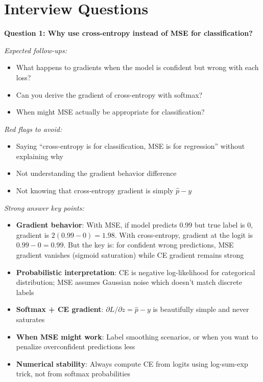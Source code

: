 \documentclass[../../main.tex]{subfiles}
\begin{document}
\section*{Interview Questions}
\begin{interviewquestions}

\textbf{Question 1: Why use cross-entropy instead of MSE for classification?}

\textit{Expected follow-ups:}
\begin{itemize}
    \item What happens to gradients when the model is confident but wrong with each loss?
    \item Can you derive the gradient of cross-entropy with softmax?
    \item When might MSE actually be appropriate for classification?
\end{itemize}

\textit{Red flags to avoid:}
\begin{itemize}
    \item Saying ``cross-entropy is for classification, MSE is for regression'' without explaining why
    \item Not understanding the gradient behavior difference
    \item Not knowing that cross-entropy gradient is simply $\hat{p} - y$
\end{itemize}

\textit{Strong answer key points:}
\begin{itemize}
    \item \textbf{Gradient behavior}: With MSE, if model predicts 0.99 but true label is 0, gradient is $2(0.99-0) = 1.98$. With cross-entropy, gradient at the logit is $0.99 - 0 = 0.99$. But the key is: for confident wrong predictions, MSE gradient vanishes (sigmoid saturation) while CE gradient remains strong
    \item \textbf{Probabilistic interpretation}: CE is negative log-likelihood for categorical distribution; MSE assumes Gaussian noise which doesn't match discrete labels
    \item \textbf{Softmax + CE gradient}: $\partial L / \partial z = \hat{p} - y$ is beautifully simple and never saturates
    \item \textbf{When MSE might work}: Label smoothing scenarios, or when you want to penalize overconfident predictions less
    \item \textbf{Numerical stability}: Always compute CE from logits using log-sum-exp trick, not from softmax probabilities
\end{itemize}


\end{interviewquestions}
\end{document}
